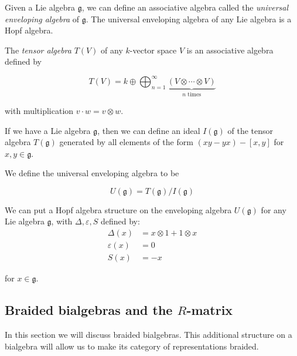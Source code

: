 \begin{example}
    \label{example:UEA}
    Given a Lie algebra $\mathfrak{g}$, we can define an associative algebra
    called the \emph{universal enveloping algebra} of $\mathfrak{g}$. The
    universal enveloping algebra of any Lie algebra is a Hopf algebra.

    The \emph{tensor algebra} $T(V)$ of any $k$-vector space $V$ is an associative
    algebra defined by

    \begin{equation}
        T(V) = k \oplus \bigoplus_{n=1}^\infty \underbrace{(V \otimes \cdots \otimes V)}_{\text{$n$ times}}
    \end{equation}

    with multiplication $v \cdot w = v \otimes w$.


    If we have a Lie algebra $\mathfrak{g}$, then we can define an ideal
    $I(\mathfrak{g})$ of the tensor algebra $T(\mathfrak{g})$ generated by all
    elements of the form $(xy - yx) - \left[ x,y \right]$ for $x,y \in
    \mathfrak{g}$.

    We define the universal enveloping algebra to be 

    \begin{equation}
        U(\mathfrak{g}) = T(\mathfrak{g}) / I(\mathfrak{g})
    \end{equation}

    We can put a Hopf algebra structure on the enveloping algebra
    $U(\mathfrak{g})$ for any Lie algebra $\mathfrak{g}$, with $\Delta,
    \varepsilon, S$ defined by: 
    \begin{align}
        \Delta(x) &= x \otimes 1 + 1 \otimes x \\
        \varepsilon(x) &= 0 \\
        S(x) &= -x  
    \end{align}

    for $x \in \mathfrak{g}$.

\end{example}

\subsection{Braided bialgebras and the $R$-matrix}
\label{subsection:R-matrix}

In this section we will discuss braided bialgebras. This additional structure
on a bialgebra will allow us to make its category of representations braided.

